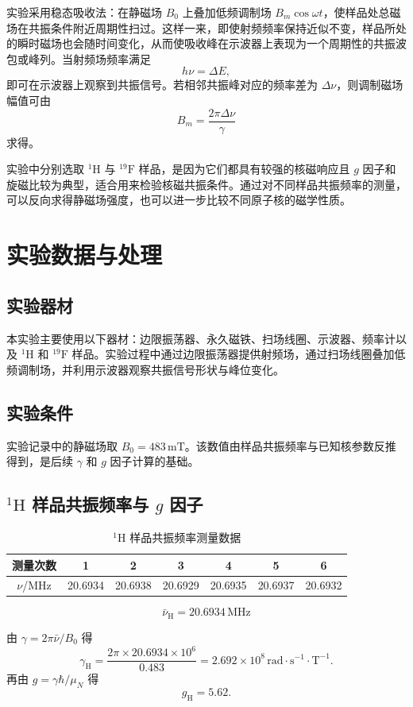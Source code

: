 \documentclass[12pt,a4paper]{article}
\begin{document}
实验采用稳态吸收法：在静磁场 $B_0$ 上叠加低频调制场 $B_m\cos\omega t$，使样品处总磁场在共振条件附近周期性扫过。这样一来，即使射频频率保持近似不变，样品所处的瞬时磁场也会随时间变化，从而使吸收峰在示波器上表现为一个周期性的共振波包或峰列。当射频场频率满足
\[
h\nu = \Delta E,
\]
即可在示波器上观察到共振信号。若相邻共振峰对应的频率差为 $\Delta\nu$，则调制磁场幅值可由
\[
B_m = \frac{2\pi\Delta\nu}{\gamma}
\]
求得。

实验中分别选取 $^1\mathrm{H}$ 与 $^{19}\mathrm{F}$ 样品，是因为它们都具有较强的核磁响应且 $g$ 因子和旋磁比较为典型，适合用来检验核磁共振条件。通过对不同样品共振频率的测量，可以反向求得静磁场强度，也可以进一步比较不同原子核的磁学性质。

\section{实验数据与处理}
\subsection{实验器材}
本实验主要使用以下器材：边限振荡器、永久磁铁、扫场线圈、示波器、频率计以及 $^1\mathrm{H}$ 和 $^{19}\mathrm{F}$ 样品。实验过程中通过边限振荡器提供射频场，通过扫场线圈叠加低频调制场，并利用示波器观察共振信号形状与峰位变化。

\subsection{实验条件}
实验记录中的静磁场取 $B_0 = 483\,\mathrm{mT}$。该数值由样品共振频率与已知核参数反推得到，是后续 $\gamma$ 和 $g$ 因子计算的基础。

\subsection{$^1\mathrm{H}$ 样品共振频率与 $g$ 因子}
\begin{table}[htbp]
\centering
\caption{$^1\mathrm{H}$ 样品共振频率测量数据}
\begin{tabular}{ccccccc}
\toprule
测量次数 & 1 & 2 & 3 & 4 & 5 & 6 \\
\midrule
$\nu$/MHz & 20.6934 & 20.6938 & 20.6929 & 20.6935 & 20.6937 & 20.6932 \\
\bottomrule
\end{tabular}
\end{table}

\[
\bar{\nu}_{\mathrm{H}} = 20.6934\,\mathrm{MHz}
\]

由 $\gamma = 2\pi\bar{\nu}/B_0$ 得
\[
\gamma_{\mathrm{H}} = \frac{2\pi\times 20.6934\times 10^6}{0.483}
= 2.692\times 10^8\,\mathrm{rad\cdot s^{-1}\cdot T^{-1}}.
\]
再由 $g = \gamma\hbar/\mu_N$ 得
\[
g_{\mathrm{H}} = 5.62.
\]
\end{document}
